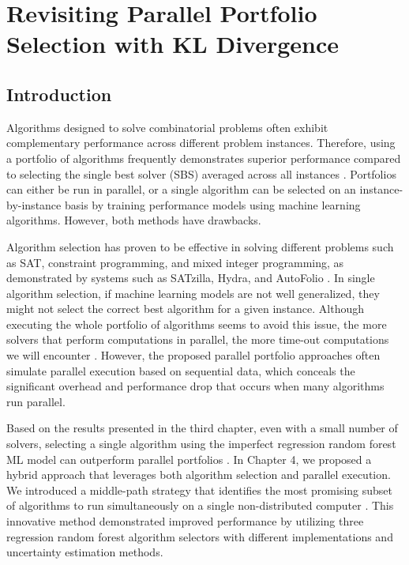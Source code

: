 
\chapter{Revisiting Parallel Portfolio Selection with KL Divergence}


\section{Introduction}

Algorithms designed to solve combinatorial problems often exhibit complementary performance across different problem instances. Therefore, using a portfolio of algorithms frequently demonstrates superior performance compared to selecting the single best solver (SBS) averaged across all instances \cite{Huberman1997,GOMES200143}. Portfolios can either be run in parallel, or a single algorithm can be selected on an instance-by-instance basis by training performance models using machine learning algorithms. However, both methods have drawbacks. 

Algorithm selection has proven to be effective in solving different problems such as SAT, constraint programming, and mixed integer programming, as demonstrated by systems such as SATzilla, Hydra, and AutoFolio \cite{satzilla,lindauer2015autofolio,cphydra,XuEtAl11}. In single algorithm selection, if machine learning models are not well generalized, they might not select the correct best algorithm for a given instance. Although executing the whole portfolio of algorithms seems to avoid this issue, the more solvers that perform computations in parallel, the more time-out computations we will encounter \cite{pmlr-v140-kashgarani21a,LINDAUER2017272}. However, the proposed parallel portfolio approaches often simulate parallel execution based on sequential data, which conceals the significant overhead and performance drop that occurs when many algorithms run parallel. 

Based on the results presented in the third chapter, even with a small number of solvers, selecting a single algorithm using the imperfect regression random forest ML model can outperform parallel portfolios \cite{pmlr-v140-kashgarani21a}. In Chapter 4, we proposed a hybrid approach that leverages both algorithm selection and parallel execution. We introduced a middle-path strategy that identifies the most promising subset of algorithms to run simultaneously on a single non-distributed computer \cite{kashgarani2023automatic}. This innovative method demonstrated improved performance by utilizing three regression random forest algorithm selectors with different implementations and uncertainty estimation methods.

